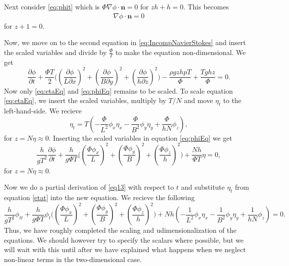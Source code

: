 \documentclass[11pt]{article}
\begin{document}
Next consider \eqref{eq:phit} which is $
\Phi \nabla \phi \cdot \bm{n} = 0 $ for $ zh + h = 0$. This becomes
\begin{align}\label{2.9a scaled}
\nabla \phi \cdot \bm{n} = 0
\end{align}
for $z +1 = 0$.


Now, we move on to the second equation in \eqref{eq:IncompNavierStokes} and insert the scaled variables and divide by $\frac{\Phi}{T}$ to make the equation non-dimensional. We get
\begin{equation*}
\frac{\partial \phi}{\partial t} + \frac{\Phi T}{2}\Big((\frac{\partial \phi}{L\partial x})^2 + (\frac{\partial\phi}{B\partial y})^2 + (\frac{\partial \phi}{h\partial z})^2\Big) - \frac{\rho g z h p T }{\Phi} + \frac{Tghz}{\Phi} = 0.
\end{equation*}
Now only \eqref{eq:etaEq} and \eqref{eq:phiEq} remains to be scaled. %
To scale equation \eqref{eq:etaEq}, we insert the scaled variables, multiply by $T/N$ and move $\eta_t$ to the left-hand-side. We recieve
\begin{equation} \label{etat}
 \eta_t = T (-\frac{\Phi}{L^2} \phi_x  \eta_x - \frac{\Phi}{B^2} \phi_y \eta_y + \frac{\Phi}{hN} \phi_z ),
\end{equation}
for $z = N\eta \approx 0$.
Inserting the scaled variables in equation \eqref{eq:phiEq} we get
\begin{equation} \label{eq13}
\frac{ h}{g T^2 } \frac{\partial \phi }{\partial t} + \frac{h}{g\Phi T}\Big((\frac{\Phi \phi_x}{L})^2+(\frac{\Phi \phi_y}{B})^2+(\frac{\Phi \phi_z}{h})^2\Big) + \frac{Nh}{\Phi T}\eta = 0,
\end{equation}
for $z = N\eta \approx 0$.


Now we do a partial derivation of \eqref{eq13} with respect to $t$ and substitute $\eta_t$ from equation \eqref{etat} into the new equation. We recieve the following
\begin{equation} \label{ti}
\frac{ h}{ g T^2 } \phi_{tt}+ \frac{h}{g \Phi T} \phi_t\Big((\frac{\Phi \phi_x}{L})^2+(\frac{\Phi \phi_y}{B})^2+(\frac{\Phi \phi_z}{h})^2\Big) + Nh(-\frac{1}{L^2} \phi_x  \eta_x - \frac{1}{B^2} \phi_y \eta_y + \frac{1}{hN} \phi_z ) = 0.
\end{equation}
Thus, we have roughly completed the scaling and udimensionalization of the equations. We should however try to specify the scalars where possible, but we will wait with this until after we have explained what happens when we neglect non-linear terms in the two-dimensional case.
\end{document}
